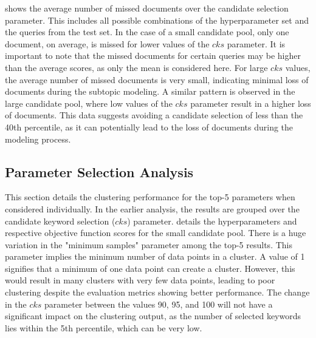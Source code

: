   shows the average number of missed documents over the candidate selection parameter. This includes all possible combinations of the hyperparameter set and the queries from the test set. In the case of a small candidate pool, only one document, on average, is missed for lower values of the $cks$ parameter. It is important to note that the missed documents for certain queries may be higher than the average scores, as only the mean is considered here. For large $cks$ values, the average number of missed documents is very small, indicating minimal loss of documents during the subtopic modeling. A similar pattern is observed in the large candidate pool, where low values of the $cks$ parameter result in a higher loss of documents. This data suggests avoiding a candidate selection of less than the 40th percentile, as it can potentially lead to the loss of documents during the modeling process.

\subsection{Parameter Selection Analysis}


This section details the clustering performance for the top-5 parameters when considered individually. In the earlier analysis, the results are grouped over the candidate keyword selection ($cks$) parameter.  details the hyperparameters and respective objective function scores for the small candidate pool. There is a huge variation in the "minimum samples" parameter among the top-5 results. This parameter implies the minimum number of data points in a cluster. A value of 1 signifies that a minimum of one data point can create a cluster. However, this would result in many clusters with very few data points, leading to poor clustering despite the evaluation metrics showing better performance. The change in the $cks$ parameter between the values 90, 95, and 100 will not have a significant impact on the clustering output, as the number of selected keywords lies within the 5th percentile, which can be very low.


